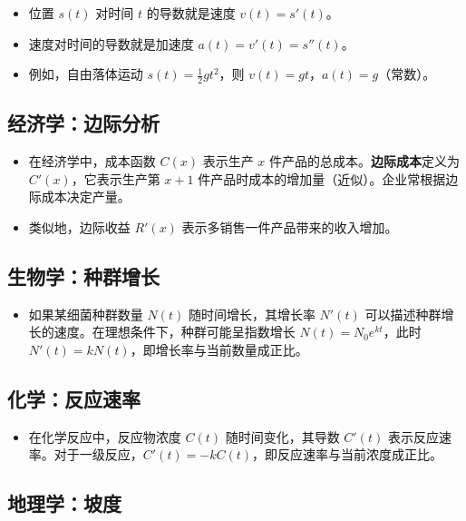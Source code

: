 \documentclass[10pt]{article}
\begin{document}
\begin{itemize}
    \item 位置 $s(t)$ 对时间 $t$ 的导数就是速度 $v(t) = s'(t)$。
    \item 速度对时间的导数就是加速度 $a(t) = v'(t) = s''(t)$。
    \item 例如，自由落体运动 $s(t) = \frac{1}{2}gt^2$，则 $v(t) = gt$，$a(t) = g$（常数）。
\end{itemize}

\subsection{经济学：边际分析}

\begin{itemize}
    \item 在经济学中，成本函数 $C(x)$ 表示生产 $x$ 件产品的总成本。\textbf{边际成本}定义为 $C'(x)$，它表示生产第 $x+1$ 件产品时成本的增加量（近似）。企业常根据边际成本决定产量。
    \item 类似地，边际收益 $R'(x)$ 表示多销售一件产品带来的收入增加。
\end{itemize}

\subsection{生物学：种群增长}

\begin{itemize}
    \item 如果某细菌种群数量 $N(t)$ 随时间增长，其增长率 $N'(t)$ 可以描述种群增长的速度。在理想条件下，种群可能呈指数增长 $N(t) = N_0 e^{kt}$，此时 $N'(t) = k N(t)$，即增长率与当前数量成正比。
\end{itemize}

\subsection{化学：反应速率}

\begin{itemize}
    \item 在化学反应中，反应物浓度 $C(t)$ 随时间变化，其导数 $C'(t)$ 表示反应速率。对于一级反应，$C'(t) = -k C(t)$，即反应速率与当前浓度成正比。
\end{itemize}

\subsection{地理学：坡度}
\end{document}
